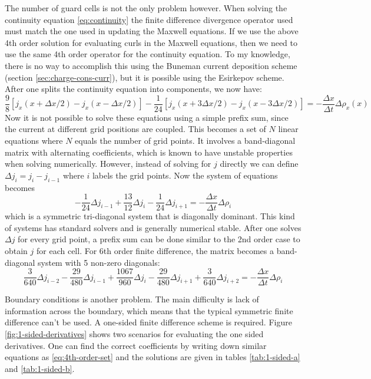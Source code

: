 The number of guard cells is not the only problem however. When solving the
continuity equation \eqref{eq:continuity} the finite difference divergence
operator used must match the one used in updating the Maxwell equations. If we
use the above 4th order solution for evaluating curls in the Maxwell equations,
then we need to use the same 4th order operator for the continuity equation. To
my knowledge, there is no way to accomplish this using the Buneman current
deposition scheme (section \ref{sec:charge-cons-curr}), but it is possible using
the Esirkepov scheme. After one splits the continuity equation into components,
we now have:
\begin{equation}
  \label{eq:4th-order-esirkepov}
  \frac{9}{8}\left[ j_x(x+\Delta x/2) - j_x(x-\Delta x/2)\right] - \frac{1}{24}\left[ j_x(x + 3\Delta x/2) - j_x(x - 3\Delta x/2) \right] = -\frac{\Delta x}{\Delta t}\Delta \rho_x(x)
\end{equation}
Now it is not possible to solve these equations using a simple prefix sum, since
the current at different grid positions are coupled. This becomes a set of $N$
linear equations where $N$ equals the number of grid points. It involves a
band-diagonal matrix with alternating coefficients, which is known to have
unstable properties when solving numerically. However, instead of solving for
$j$ directly we can define $\Delta j_i = j_i - j_{i-1}$ where $i$ labels the
grid points. Now the system of equations becomes
\begin{equation}
  \label{eq:4th-order-system}
  - \frac{1}{24}\Delta j_{i-1} + \frac{13}{12}\Delta j_i - \frac{1}{24}\Delta j_{i+1} = -\frac{\Delta x}{\Delta t}\Delta \rho_{i}
\end{equation}
which is a symmetric tri-diagonal system that is diagonally dominant. This kind
of systems has standard solvers and is generally numerical stable. After one
solves $\Delta j$ for every grid point, a prefix sum can be done similar to the
2nd order case to obtain $j$ for each cell. For 6th order finite difference, the
matrix becomes a band-diagonal system with 5 non-zero diagonals:
\begin{equation}
  \label{eq:6th-order-system}
  \frac{3}{640}\Delta j_{i-2} - \frac{29}{480}\Delta j_{i-1} + \frac{1067}{960}\Delta j_i - \frac{29}{480}\Delta j_{i+1} + \frac{3}{640}\Delta j_{i+2} = -\frac{\Delta x}{\Delta t}\Delta \rho_{i}
\end{equation}

Boundary conditions is another problem. The main difficulty is lack of
information across the boundary, which means that the typical symmetric finite
difference can't be used. A one-sided finite difference scheme is required.
Figure \ref{fig:1-sided-derivatives} shows two scenarios for evaluating the one
sided derivatives. One can find the correct coefficients by writing down similar
equations as \eqref{eq:4th-order-set} and the solutions are given in tables
\ref{tab:1-sided-a} and \ref{tab:1-sided-b}. %


